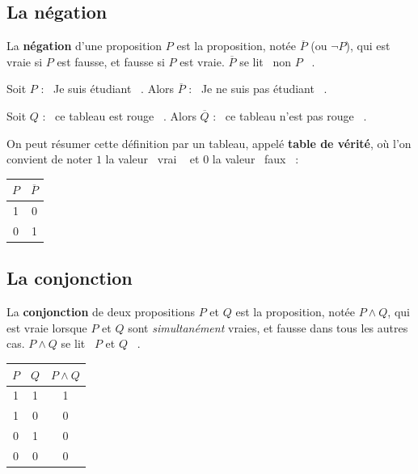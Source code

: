 \documentclass[a4paper,12pt,openany]{book}
\providecommand{\og}{\guillemotleft~}
\providecommand{\fg}{\ifhmode~\fi\guillemotright}
\begin{document}
\subsection{La négation}


\begin{definition}
La \textbf{négation} d'une proposition $P$ est la proposition, notée $\overline{P}$
(ou $\lnot P$), qui est vraie si $P$ est fausse, et fausse si $P$ est vraie.
$\overline{P}$ se lit \og non $P$ \fg.
\end{definition}

\begin{exemple}
Soit $P$ : \og Je suis étudiant \fg. Alors $\overline{P}$ : \og Je ne suis pas
étudiant \fg.

Soit $Q$ : \og ce tableau est rouge \fg. Alors $\overline{Q}$ : \og ce tableau
n'est pas rouge \fg.
\end{exemple}


On peut résumer cette définition par un tableau, appelé \textbf{table de
vérité}, où l'on convient de noter $1$ la valeur \og vrai \fg{} et $0$ la
valeur \og faux \fg :

\begin{center}
\begin{tabular}{|c|c|}
\hline
$P$ & $\overline{P}$ \\
\hline
1 & 0 \\
0 & 1 \\
\hline
\end{tabular}
\end{center}

\subsection{La conjonction}

\begin{definition}
La \textbf{conjonction} de deux propositions $P$ et $Q$ est la proposition,
notée $P\wedge Q$, qui est vraie lorsque $P$ et $Q$ sont \emph{simultanément}
vraies, et fausse dans tous les autres cas. $P\wedge Q$ se lit \og $P$ et
$Q$ \fg.
\end{definition}

\begin{center}
\begin{tabular}{|c|c|c|}
\hline
$P$ & $Q$ & $P\wedge Q$ \\
\hline
1 & 1 & 1 \\
1 & 0 & 0 \\
0 & 1 & 0 \\
0 & 0 & 0 \\
\hline
\end{tabular}
\end{center}
\end{document}
